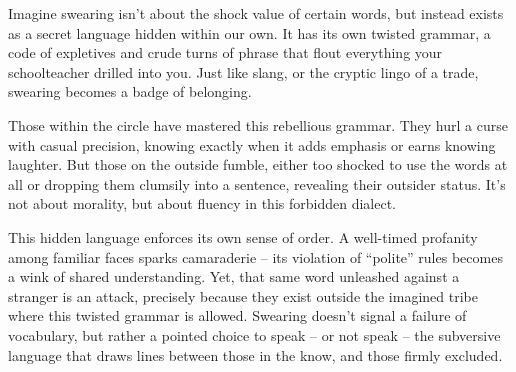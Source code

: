 Imagine swearing isn't about the shock value of certain words, but instead exists as a secret language hidden within our own. It has its own twisted grammar, a code of expletives and crude turns of phrase that flout everything your schoolteacher drilled into you. Just like slang, or the cryptic lingo of a trade, swearing becomes a badge of belonging.

Those within the circle have mastered this rebellious grammar. They hurl a curse with casual precision, knowing exactly when it adds emphasis or earns knowing laughter.  But those on the outside fumble, either too shocked to use the words at all or dropping them clumsily into a sentence, revealing their outsider status. It's not about morality, but about fluency in this forbidden dialect.

This hidden language enforces its own sense of order. A well-timed profanity among familiar faces sparks camaraderie – its violation of “polite” rules becomes a wink of shared understanding. Yet, that same word unleashed against a stranger is an attack, precisely because they exist outside the imagined tribe where this twisted grammar is allowed. Swearing doesn't signal a failure of vocabulary, but rather a pointed choice to speak – or not speak – the subversive language that draws lines between those in the know, and those firmly excluded.

